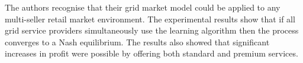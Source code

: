 The authors recognise that their grid market model could be applied to any
multi-seller retail market environment.  The experimental results show that if
all grid service providers simultaneously use the learning algorithm then the
process converges to a Nash equilibrium.  The results also showed that
significant increases in profit were possible by offering both standard and
premium services.


%
%

